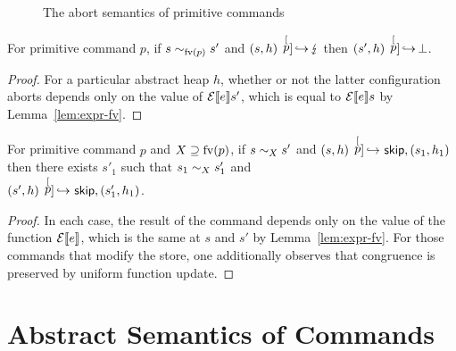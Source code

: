 \documentclass[11pt]{report}
\begin{document}
\begin{figure}[h]
	\centering

	\vspace{1em}
	
	
	\vspace{1em}
	

	\vspace{1em}
	
	

	\caption{The abort semantics of primitive commands}
	\label{fig:pc-abort-step}
\end{figure}

\begin{lemma}
	\label{lem:pcomm-fv-abort}
	For primitive command $p$, if $s \sim_{\mathrm{fv}(p)} s'$ and $(s,h) \,\stackrel[p]{}{\,\hookrightarrow}\, \lightning$ then $(s',h) \,\stackrel[p]{}{\,\hookrightarrow}\, \bot$. 
\end{lemma}

\begin{proof}
	For a particular abstract heap $h$, whether or not the latter configuration aborts depends only on the value of $\mathcal{E}[\![e]\!]s'$, which is equal to $\mathcal{E}[\![e]\!]s$ by Lemma~\ref{lem:expr-fv}. 
\end{proof}

\begin{lemma}\label{lem:pcomm-fv-step}
	For primitive command $p$ and $X \supseteq \mathrm{fv}(p)$, if $s \sim_{X} s'$ and $(s,h) \,\stackrel[p]{}{\,\hookrightarrow}\, \operatorname{\mathsf{skip}},(s_1,h_1)$ then there exists $s'_1$  such that $s_1 \sim_{X} s'_1$ and \\ $(s',h) \,\stackrel[p]{}{\,\hookrightarrow}\, \operatorname{\mathsf{skip}},(s'_1,h_1)$.
\end{lemma}

\begin{proof}
	In each case, the result of the command depends only on the value of the function $\mathcal{E}[\![e]\!]$, which is the same at $s$ and $s'$ by Lemma~\ref{lem:expr-fv}. For those commands that modify the store, one additionally observes that congruence is preserved by uniform function update. 
\end{proof}



\section{Abstract Semantics of Commands} %
\label{sec:abstract_semantics_of_commands}
\end{document}
